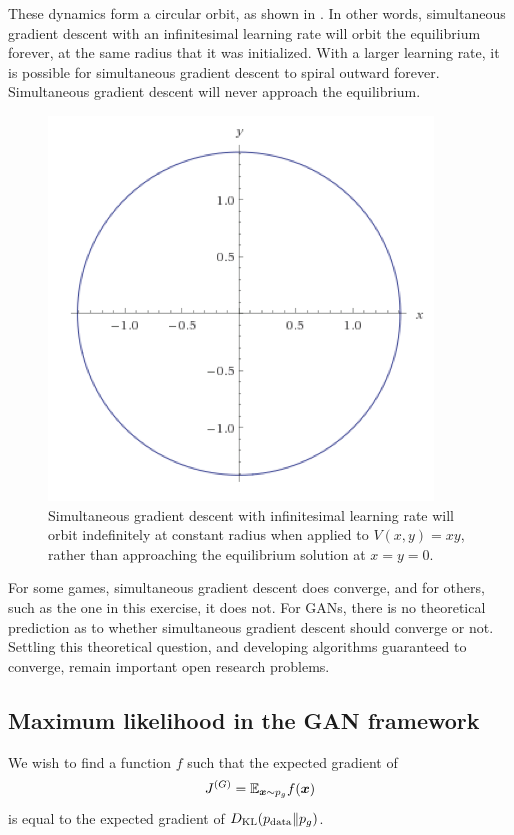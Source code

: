 These dynamics form a circular orbit, as shown in .
In other words, simultaneous gradient descent with an infinitesimal learning rate
will orbit the equilibrium forever, at the same radius that it was initialized.
With a larger learning rate, it is possible for simultaneous gradient descent to
spiral outward forever.
Simultaneous gradient descent will never approach the equilibrium.

\begin{figure}
  \center
  \includegraphics[width=\figwidth]{orbit}
  \caption{Simultaneous gradient descent with infinitesimal learning rate
    will orbit indefinitely at constant radius when applied to $V(x,y) = xy$,
    rather than approaching the equilibrium solution at $x=y=0$.
  }
  \label{fig:orbit}
\end{figure}

For some games, simultaneous gradient descent does converge, and for others,
such as the one in this exercise, it does not.
For GANs, there is no theoretical prediction as to whether simultaneous
gradient descent should converge or not.
Settling this theoretical question, and developing algorithms guaranteed to
converge, remain important open research problems.

\subsection{Maximum likelihood in the GAN framework}
\label{sec:mle_soln}

We wish to find a function $f$ such that the expected gradient of 
\begin{equation}
  J^{(G)} = \mathbb{E}_{{\bm{x}} \sim p_g} f({\bm{x}})
  \label{eq:cost_per_sample}
\end{equation}
is equal to the expected gradient of 
$D_{\mathrm{KL}}(p_{\rm{data}} \Vert p_g)$.

